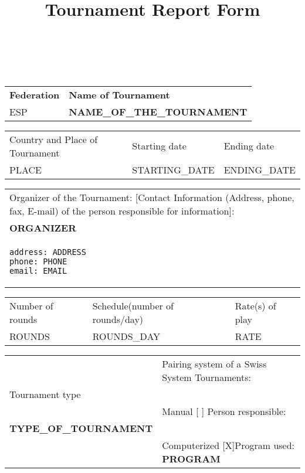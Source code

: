\documentclass[11pt, a4paper]{article}
\title{Tournament Report Form}
\date{}
\author{}
\begin{document}
\thispagestyle{empty}

\begin{table}[ht]
\\
\\
\small
\noindent\begin{tabular}{|p{5cm}|p{10.97cm}|}
\hline
{\bfseries Federation}&{\bfseries Name of Tournament}\\
\normalsize ESP&\bfseries\normalsize NAME_OF_THE_TOURNAMENT\\
\hline
\end{tabular}

\noindent\begin{tabular}{|p{11cm}|p{2.28cm}|p{2.27cm}|}
Country and Place of Tournament&Starting date&Ending date\\
PLACE&STARTING_DATE&ENDING_DATE \\
\hline
\end{tabular}

\noindent\begin{tabular}{|p{16.4cm}|}
Organizer of the Tournament: [Contact Information (Address, phone, fax, E-mail) of the person responsible for information]:\\
{\normalsize\bfseries ORGANIZER}\\
\begin{verbatim}
address: ADDRESS
phone: PHONE
email: EMAIL
\end{verbatim}
\\
\hline
\end{tabular}

\noindent\begin{tabular}{|p{5cm}|p{5.4cm}|p{5.15cm}|}
Number of rounds&Schedule(number of rounds/day)&Rate(s) of play\\
ROUNDS&ROUNDS_DAY&RATE\\
\hline
\end{tabular}

\noindent\begin{tabular}{|p{4cm}|p{11.97cm}|}
&Pairing system of a Swiss System Tournaments:\\
Tournament type&\\
&Manual\hspace{1cm} [ ]\hspace{1cm} Person responsible:\\
{\bfseries \normalsize TYPE_OF_TOURNAMENT}& \\
&Computerized [X]\hspace{1cm}Program used: {\bfseries PROGRAM}\\
\hline
\end{tabular}


\end{table}
\end{document}
